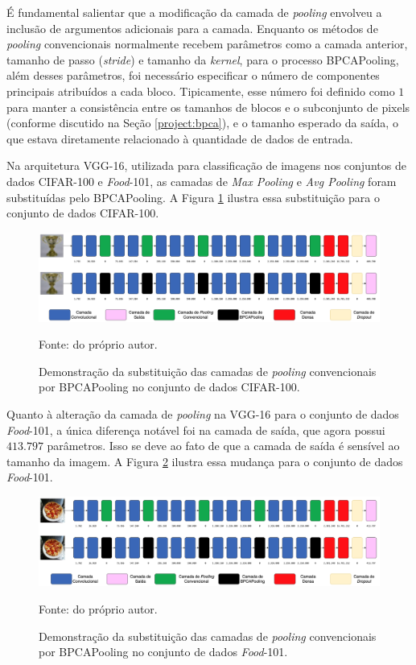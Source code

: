 É fundamental salientar que a modificação da camada de \textit{pooling} envolveu a inclusão de argumentos adicionais para a camada. Enquanto os métodos de \textit{pooling} convencionais normalmente recebem parâmetros como a camada anterior, tamanho de passo (\textit{stride}) e tamanho da \textit{kernel}, para o processo BPCAPooling, além desses parâmetros, foi necessário especificar o número de componentes principais atribuídos a cada bloco. Tipicamente, esse número foi definido como $1$ para manter a consistência entre os tamanhos de blocos e o subconjunto de pixels (conforme discutido na Seção \ref{project:bpca}), e o tamanho esperado da saída, o que estava diretamente relacionado à quantidade de dados de entrada.

Na arquitetura VGG-16, utilizada para classificação de imagens nos conjuntos de dados CIFAR-100 e \textit{Food}-101, as camadas de \textit{Max Pooling} e \textit{Avg Pooling} foram substituídas pelo BPCAPooling. A Figura \ref{project:fig:change_pooling:vgg-cifar} ilustra essa substituição para o conjunto de dados CIFAR-100.

\begin{figure}[H]
    \centering
    \caption{Demonstração da substituição das camadas de \textit{pooling} convencionais por BPCAPooling no conjunto de dados CIFAR-100.}
    \includegraphics[width=1\textwidth]{recursos/imagens/project/vgg-with-bpca-cifar.png}
    \label{project:fig:change_pooling:vgg-cifar}

    Fonte: do próprio autor.
\end{figure}

Quanto à alteração da camada de \textit{pooling} na VGG-16 para o conjunto de dados \textit{Food}-101, a única diferença notável foi na camada de saída, que agora possui $413.797$ parâmetros. Isso se deve ao fato de que a camada de saída é sensível ao tamanho da imagem. A Figura \ref{project:fig:change_pooling:vgg-food} ilustra essa mudança para o conjunto de dados \textit{Food}-101.

\begin{figure}[H]
    \centering
    \caption{Demonstração da substituição das camadas de \textit{pooling} convencionais por BPCAPooling no conjunto de dados \textit{Food}-101.}
    \includegraphics[width=1\textwidth]{recursos/imagens/project/vgg-with-bpca-food.png}
    \label{project:fig:change_pooling:vgg-food}

    Fonte: do próprio autor.
\end{figure}

